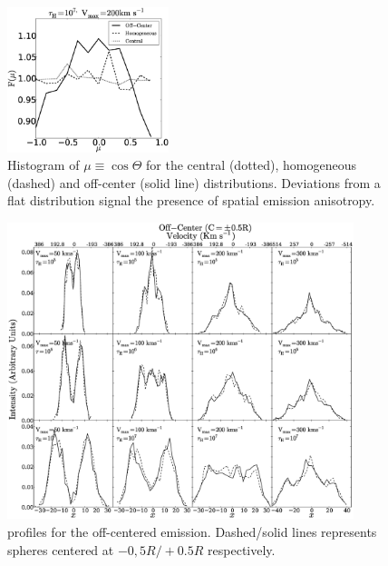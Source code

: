 \documentclass{emulateapj}
\newcommand{\ly}{{\ifmmode{{\rm Ly}\alpha~}\else{Ly$\alpha$~}\fi}}
\begin{document}
\begin{figure}
  \includegraphics[width=0.42\textwidth]{f9.eps}
  \caption{Histogram of $\mu\equiv\cos\Theta$ for the 
    central (dotted), homogeneous (dashed) and off-center (solid
    line) distributions. Deviations from a flat distribution signal the presence of
    spatial emission anisotropy. 
    \label{fig:muhisto}} 
\end{figure}

\begin{figure}
\begin{center}
\includegraphics[width=0.90\textwidth]{f10.eps}
\end{center}
\caption{\ly profiles for the off-centered emission. Dashed/solid
  lines represents spheres centered at $-0,5R/+0.5R$ respectively.
   \label{fig:OC_profiles}} 
\end{figure}
\end{document}
